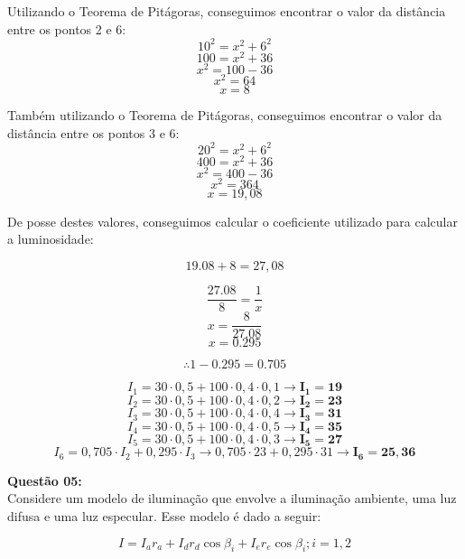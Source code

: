 \noindent Utilizando o Teorema de Pitágoras, conseguimos encontrar o valor da distância entre os pontos 2 e 6:
\[10^2 = x^2 + 6^2\]
\[100 = x^2 + 36\]
\[x^2 = 100-36\]
\[x^2 = 64\]
\[x = 8\]

\noindent Também utilizando o Teorema de Pitágoras, conseguimos encontrar o valor da distância entre os pontos 3 e 6:
\[20^2 = x^2 + 6^2\]
\[400 = x^2 + 36\]
\[x^2 = 400 - 36\]
\[x^2 = 364\]
\[x = 19,08\]

\noindent De posse destes valores, conseguimos calcular o coeficiente utilizado para calcular a luminosidade:

\[19.08 + 8 = 27,08\]

\noindent{}
\[\frac{27.08}{8} = \frac{1}{x}\]
\[x = \frac{8}{27.08}\]
\[x = 0.295\]

\noindent{}
\[\therefore 1 - 0.295 = 0.705\]

\noindent{}
\[I_1 = 30 \cdot 0,5 + 100 \cdot 0,4 \cdot 0,1 \rightarrow \mathbf{I_1 = 19}\]
\[I_2 = 30 \cdot 0,5 + 100 \cdot 0,4 \cdot 0,2 \rightarrow \mathbf{I_2 = 23}\]
\[I_3 = 30 \cdot 0,5 + 100 \cdot 0,4 \cdot 0,4 \rightarrow \mathbf{I_3 = 31}\]
\[I_4 = 30 \cdot 0,5 + 100 \cdot 0,4 \cdot 0,5 \rightarrow \mathbf{I_4 = 35}\]
\[I_5 = 30 \cdot 0,5 + 100 \cdot 0,4 \cdot 0,3 \rightarrow \mathbf{I_5 = 27}\]
\[I_6 = 0,705 \cdot I_2 + 0,295 \cdot I_3 \rightarrow 0,705 \cdot 23 + 0,295 \cdot 31 \rightarrow \mathbf{I_6 = 25,36}\]
\vspace{1cm}

\noindent\textbf{Questão 05:}\\
Considere um modelo de iluminação que envolve a iluminação ambiente, uma luz difusa e uma luz especular. Esse modelo é dado a seguir: 

\[I = I_a r_a + I_d r_d \cos{\beta_i} + I_e r_e \cos{\beta_i}; i = {1, 2}\]

